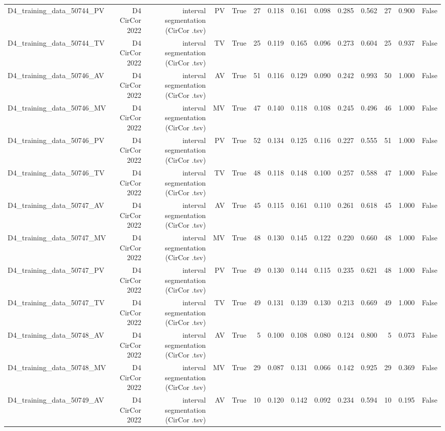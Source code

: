 \begin{table}[htbp]
\begin{tabular}{lrrrrrrrrrrrrr}
    D4\_training\_data\_50744\_PV & D4 CirCor 2022 & interval segmentation (CirCor .tsv) & PV & True & 27 & 0.118 & 0.161 & 0.098 & 0.285 & 0.562 & 27 & 0.900 & False \\
    D4\_training\_data\_50744\_TV & D4 CirCor 2022 & interval segmentation (CirCor .tsv) & TV & True & 25 & 0.119 & 0.165 & 0.096 & 0.273 & 0.604 & 25 & 0.937 & False \\
    D4\_training\_data\_50746\_AV & D4 CirCor 2022 & interval segmentation (CirCor .tsv) & AV & True & 51 & 0.116 & 0.129 & 0.090 & 0.242 & 0.993 & 50 & 1.000 & False \\
    D4\_training\_data\_50746\_MV & D4 CirCor 2022 & interval segmentation (CirCor .tsv) & MV & True & 47 & 0.140 & 0.118 & 0.108 & 0.245 & 0.496 & 46 & 1.000 & False \\
    D4\_training\_data\_50746\_PV & D4 CirCor 2022 & interval segmentation (CirCor .tsv) & PV & True & 52 & 0.134 & 0.125 & 0.116 & 0.227 & 0.555 & 51 & 1.000 & False \\
    D4\_training\_data\_50746\_TV & D4 CirCor 2022 & interval segmentation (CirCor .tsv) & TV & True & 48 & 0.118 & 0.148 & 0.100 & 0.257 & 0.588 & 47 & 1.000 & False \\
    D4\_training\_data\_50747\_AV & D4 CirCor 2022 & interval segmentation (CirCor .tsv) & AV & True & 45 & 0.115 & 0.161 & 0.110 & 0.261 & 0.618 & 45 & 1.000 & False \\
    D4\_training\_data\_50747\_MV & D4 CirCor 2022 & interval segmentation (CirCor .tsv) & MV & True & 48 & 0.130 & 0.145 & 0.122 & 0.220 & 0.660 & 48 & 1.000 & False \\
    D4\_training\_data\_50747\_PV & D4 CirCor 2022 & interval segmentation (CirCor .tsv) & PV & True & 49 & 0.130 & 0.144 & 0.115 & 0.235 & 0.621 & 48 & 1.000 & False \\
    D4\_training\_data\_50747\_TV & D4 CirCor 2022 & interval segmentation (CirCor .tsv) & TV & True & 49 & 0.131 & 0.139 & 0.130 & 0.213 & 0.669 & 49 & 1.000 & False \\
    D4\_training\_data\_50748\_AV & D4 CirCor 2022 & interval segmentation (CirCor .tsv) & AV & True & 5 & 0.100 & 0.108 & 0.080 & 0.124 & 0.800 & 5 & 0.073 & False \\
    D4\_training\_data\_50748\_MV & D4 CirCor 2022 & interval segmentation (CirCor .tsv) & MV & True & 29 & 0.087 & 0.131 & 0.066 & 0.142 & 0.925 & 29 & 0.369 & False \\
    D4\_training\_data\_50749\_AV & D4 CirCor 2022 & interval segmentation (CirCor .tsv) & AV & True & 10 & 0.120 & 0.142 & 0.092 & 0.234 & 0.594 & 10 & 0.195 & False \\

\end{tabular}
\end{table}
